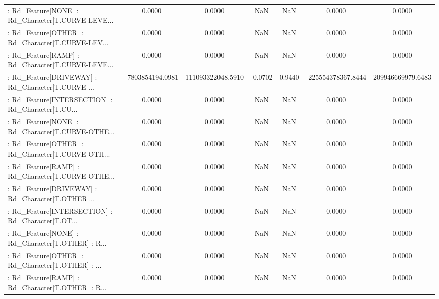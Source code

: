 \begin{longtable}{p{4cm}cccccc}
 : Rd\_Feature[NONE] : Rd\_Character[T.CURVE-LEVE... &            0.0000 &            0.0000 &     NaN &          NaN &             0.0000 &            0.0000 \\
 : Rd\_Feature[OTHER] : Rd\_Character[T.CURVE-LEV... &            0.0000 &            0.0000 &     NaN &          NaN &             0.0000 &            0.0000 \\
 : Rd\_Feature[RAMP] : Rd\_Character[T.CURVE-LEVE... &            0.0000 &            0.0000 &     NaN &          NaN &             0.0000 &            0.0000 \\
 : Rd\_Feature[DRIVEWAY] : Rd\_Character[T.CURVE-... &  -7803854194.0981 & 111093322048.5910 & -0.0702 &       0.9440 & -225554378367.8444 & 209946669979.6483 \\
 : Rd\_Feature[INTERSECTION] : Rd\_Character[T.CU... &            0.0000 &            0.0000 &     NaN &          NaN &             0.0000 &            0.0000 \\
 : Rd\_Feature[NONE] : Rd\_Character[T.CURVE-OTHE... &            0.0000 &            0.0000 &     NaN &          NaN &             0.0000 &            0.0000 \\
 : Rd\_Feature[OTHER] : Rd\_Character[T.CURVE-OTH... &            0.0000 &            0.0000 &     NaN &          NaN &             0.0000 &            0.0000 \\
 : Rd\_Feature[RAMP] : Rd\_Character[T.CURVE-OTHE... &            0.0000 &            0.0000 &     NaN &          NaN &             0.0000 &            0.0000 \\
 : Rd\_Feature[DRIVEWAY] : Rd\_Character[T.OTHER]... &            0.0000 &            0.0000 &     NaN &          NaN &             0.0000 &            0.0000 \\
 : Rd\_Feature[INTERSECTION] : Rd\_Character[T.OT... &            0.0000 &            0.0000 &     NaN &          NaN &             0.0000 &            0.0000 \\
 : Rd\_Feature[NONE] : Rd\_Character[T.OTHER] : R... &            0.0000 &            0.0000 &     NaN &          NaN &             0.0000 &            0.0000 \\
 : Rd\_Feature[OTHER] : Rd\_Character[T.OTHER] : ... &            0.0000 &            0.0000 &     NaN &          NaN &             0.0000 &            0.0000 \\
 : Rd\_Feature[RAMP] : Rd\_Character[T.OTHER] : R... &            0.0000 &            0.0000 &     NaN &          NaN &             0.0000 &            0.0000 \\

\end{longtable}
